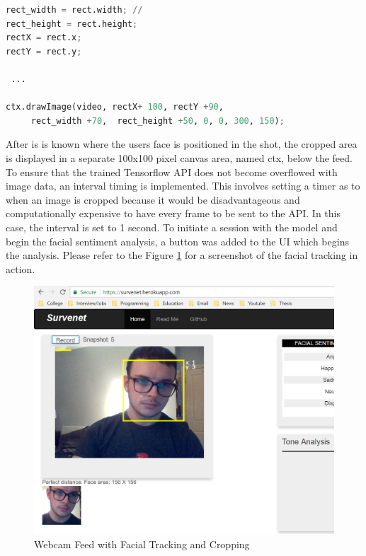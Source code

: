 \begin{lstlisting}[language=python, frame=single]
rect_width = rect.width; // 
rect_height = rect.height;
rectX = rect.x;
rectY = rect.y;

 ...

ctx.drawImage(video, rectX+ 100, rectY +90,
	 rect_width +70,  rect_height +50, 0, 0, 300, 150);
\end{lstlisting}

After is is known where the users face is positioned in the shot, the cropped area is displayed in a separate 100x100 pixel canvas area, named ctx, below the feed. To ensure that the trained Tensorflow API does not become overflowed with image data, an interval timing is implemented. This involves setting a timer as to when an image is cropped because it would be disadvantageous and computationally expensive to have every frame to be sent to the API. In this case, the interval is set to 1 second. To initiate a session with the model and begin the facial sentiment analysis, a button was added to the UI which begins the analysis. Please refer to the Figure \ref{web} for a screenshot of the facial tracking in action.

\begin{figure}[ht]
	\begin{center}
		\advance\leftskip-3cm
		\advance\rightskip-3cm
		\includegraphics[keepaspectratio=true,scale=0.5]{__resources/implementation/webapp1.png}
		\caption{Webcam Feed with Facial Tracking and Cropping}
		\label{web}
	\end{center}
\end{figure}

